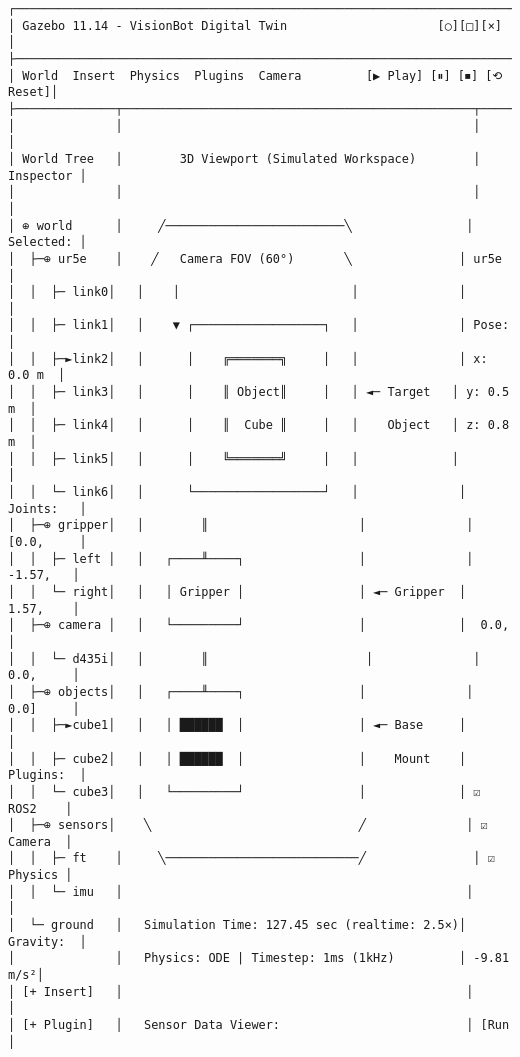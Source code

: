 \documentclass[
]{article}
\begin{document}
\begin{verbatim}
┌────────────────────────────────────────────────────────────────────────────┐
│ Gazebo 11.14 - VisionBot Digital Twin                     [○][□][×]        │
├────────────────────────────────────────────────────────────────────────────┤
│ World  Insert  Physics  Plugins  Camera         [▶ Play] [⏸] [⏹] [⟲ Reset]│
├──────────────┬─────────────────────────────────────────────────┬───────────┤
│              │                                                 │           │
│ World Tree   │        3D Viewport (Simulated Workspace)        │ Inspector │
│              │                                                 │           │
│ ⊕ world      │     ╱─────────────────────────╲                │ Selected: │
│  ├─⊕ ur5e    │    ╱   Camera FOV (60°)       ╲               │ ur5e      │
│  │  ├─ link0│   │    │                        │              │           │
│  │  ├─ link1│   │    ▼ ┌──────────────────┐   │              │ Pose:     │
│  │  ├─►link2│   │      │    ╔═══════╗     │   │              │ x: 0.0 m  │
│  │  ├─ link3│   │      │    ║ Object║     │   │ ◄─ Target   │ y: 0.5 m  │
│  │  ├─ link4│   │      │    ║  Cube ║     │   │    Object   │ z: 0.8 m  │
│  │  ├─ link5│   │      │    ╚═══════╝     │   │             │           │
│  │  └─ link6│   │      └──────────────────┘   │              │ Joints:   │
│  ├─⊕ gripper│   │        ║                     │              │ [0.0,     │
│  │  ├─ left │   │   ┌────╨────┐                │              │  -1.57,   │
│  │  └─ right│   │   │ Gripper │                │ ◄─ Gripper  │  1.57,    │
│  ├─⊕ camera │   │   └─────────┘                │             │  0.0,     │
│  │  └─ d435i│   │        ║                      │              │  0.0,     │
│  ├─⊕ objects│   │   ┌────╨────┐                │              │  0.0]     │
│  │  ├─►cube1│   │   │ ██████  │                │ ◄─ Base     │           │
│  │  ├─ cube2│   │   │ ██████  │                │    Mount    │ Plugins:  │
│  │  └─ cube3│   │   └─────────┘                │             │ ☑ ROS2    │
│  ├─⊕ sensors│    ╲                             ╱              │ ☑ Camera  │
│  │  ├─ ft    │     ╲───────────────────────────╱               │ ☑ Physics │
│  │  └─ imu   │                                                │           │
│  └─ ground   │   Simulation Time: 127.45 sec (realtime: 2.5×)│ Gravity:  │
│              │   Physics: ODE | Timestep: 1ms (1kHz)         │ -9.81 m/s²│
│ [+ Insert]   │                                                │           │
│ [+ Plugin]   │   Sensor Data Viewer:                          │ [Run      │

\end{verbatim}
\end{document}
